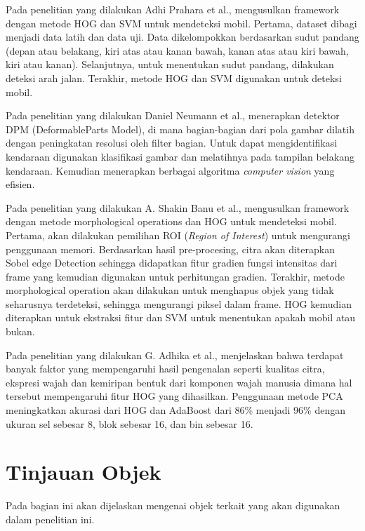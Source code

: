 Pada penelitian yang dilakukan Adhi Prahara et al., mengusulkan framework dengan metode HOG dan SVM untuk mendeteksi mobil. Pertama, dataset dibagi menjadi data latih dan data uji. Data dikelompokkan berdasarkan sudut pandang (depan atau belakang, kiri atas atau kanan bawah, kanan atas atau kiri bawah, kiri atau kanan). Selanjutnya, untuk menentukan sudut pandang, dilakukan deteksi arah jalan. Terakhir, metode HOG dan SVM digunakan untuk deteksi mobil.

Pada penelitian yang dilakukan Daniel Neumann et al., menerapkan detektor DPM (DeformableParts Model), di mana bagian-bagian dari pola gambar dilatih dengan peningkatan resolusi oleh filter bagian. Untuk dapat mengidentifikasi kendaraan digunakan klasifikasi gambar dan melatihnya pada tampilan belakang kendaraan. Kemudian menerapkan berbagai algoritma \textit{computer vision} yang efisien.

Pada penelitian yang dilakukan A. Shakin Banu et al., mengusulkan framework dengan metode morphological operations dan HOG untuk mendeteksi mobil. Pertama, akan dilakukan pemilihan ROI (\textit{Region of Interest}) untuk mengurangi penggunaan memori. Berdasarkan hasil pre-procesing, citra akan diterapkan Sobel edge Detection sehingga didapatkan fitur gradien fungsi intensitas dari frame yang kemudian digunakan untuk perhitungan gradien. Terakhir, metode morphological operation akan dilakukan untuk menghapus objek yang tidak seharusnya terdeteksi, sehingga mengurangi piksel dalam frame. HOG kemudian diterapkan untuk ekstraksi fitur dan SVM untuk menentukan apakah mobil atau bukan.

Pada penelitian yang dilakukan G. Adhika et al., menjelaskan bahwa terdapat banyak faktor yang mempengaruhi hasil pengenalan seperti kualitas citra, ekspresi wajah dan kemiripan bentuk dari komponen wajah manusia dimana hal tersebut mempengaruhi fitur HOG yang dihasilkan. Penggunaan metode PCA meningkatkan akurasi dari HOG dan AdaBoost dari 86\% menjadi 96\% dengan ukuran sel sebesar 8, blok sebesar 16, dan bin sebesar 16.\\

\section{Tinjauan Objek}
Pada bagian ini akan dijelaskan mengenai objek terkait yang akan digunakan dalam
penelitian ini.\\

